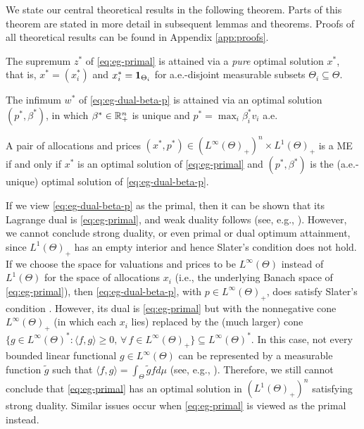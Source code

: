 We state our central theoretical results in the following theorem. Parts of this theorem are stated in more detail in subsequent lemmas and theorems. 
Proofs of all theoretical results can be found in Appendix \ref{app:proofs}. 
\begin{theorem}
	\begin{enumerate*}[label=(\alph*)]
		\item The supremum $z^*$ of \eqref{eq:eg-primal} is attained via a \emph{pure} optimal solution $x^*$, that is, $x^* = (x^*_i)$ and $x^*_i = \mathbf{1}_{\Theta_i}$ for a.e.-disjoint measurable subsets $\Theta_i\subseteq \Theta$. \label{item:eg-primal-attain}
		\item The infimum $w^*$ of \eqref{eq:eg-dual-beta-p} is attained via an optimal solution $(p^*, \beta^*)$, in which $\beta^*\in \mathbb{R}^n_+$ is unique and $p^* = \max_i \beta^*_i v_i$ a.e. \label{item:eg-dual-p-beta-attain}
		\item A pair of allocations and prices $(x^*, p^*) \in (L^\infty(\Theta)_+)^n \times L^1(\Theta)_+$ is a ME if and only if $x^*$ is an optimal solution of \eqref{eq:eg-primal} and $(p^*, \beta^*)$ is the (a.e.-unique) optimal solution of \eqref{eq:eg-dual-beta-p}. \label{item:eg-equi-iff-opt}
	\end{enumerate*}
	\label{thm:eg-equi-opt-combined}
\end{theorem}

\begin{remark}
	If we view \eqref{eq:eg-dual-beta-p} as the primal, then it can be shown that its Lagrange dual is \eqref{eq:eg-primal}, and weak duality follows (see, e.g., \cite[\S 3]{ponstein2004approaches}). 
	However, we cannot conclude strong duality, or even primal or dual optimum attainment, since $L^1(\Theta)_+$ has an empty interior \cite[\S 8.8 Problem 1]{luenberger1997optimization} and hence Slater's condition does not hold.
	If we choose the space for valuations and prices to be $L^\infty(\Theta)$ instead of $L^1(\Theta)$ for the space of allocations $x_i$ (i.e., the underlying Banach space of \eqref{eq:eg-primal}), then \eqref{eq:eg-dual-beta-p}, with $p \in L^\infty(\Theta)_+$, does satisfy Slater's condition \cite[\S 8.8 Problem 2]{luenberger1997optimization}. 
	However, its dual is \eqref{eq:eg-primal} but with the nonnegative cone $L^\infty(\Theta)_+$ (in which each $x_i$ lies) replaced by the (much larger) cone $\{ g \in L^\infty(\Theta)^*: \langle f, g \rangle \geq 0,\, \forall\, f\in L^\infty(\Theta)_+ \}\subseteq L^\infty(\Theta)^*$. In this case, not every bounded linear functional $g\in L^\infty(\Theta)$ can be represented by a measurable function $\tilde{g}$ such that $\langle f, g \rangle = \int_\Theta \tilde{g}f d\mu$ (see, e.g., \citep{day1973normed}). 
	Therefore, we still cannot conclude that \eqref{eq:eg-primal} has an optimal solution in $(L^1(\Theta)_+)^n$ satisfying strong duality. 
	Similar issues occur when \eqref{eq:eg-primal} is viewed as the primal instead. \label{remark:why-define-cp-then-prove}
\end{remark}

